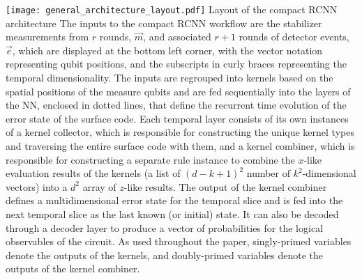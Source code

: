 \begin{figure*}[htb]
\centering
\texttt{[image: general\_architecture\_layout.pdf]}
\ccaption
{Layout of the compact RCNN architecture}
{
The inputs to the compact RCNN workflow are the stabilizer measurements from $r$ rounds, $\vec{m}$, and associated $r+1$ rounds of detector events, $\vec{e}$, which are displayed at the bottom left corner, with the vector notation representing qubit positions, and the subscripts in curly braces representing the temporal dimensionality.
The inputs are regrouped into kernels based on the spatial positions of the measure qubits and are fed sequentially into the layers of the NN, enclosed in dotted lines, that define the recurrent time evolution of the error state of the surface code. Each temporal layer consists of its own instances of a kernel collector, which is responsible for constructing the unique kernel types and traversing the entire surface code with them, and a kernel combiner, which is responsible for constructing a separate rule instance to combine the $x$-like evaluation results of the kernels (a list of $(d-k+1)^2$ number of $k^2$-dimensional vectors) into a $d^2$ array of $z$-like results. The output of the kernel combiner defines a multidimensional error state for the temporal slice and is fed into the next temporal slice as the last known (or initial) state. It can also be decoded through a decoder layer to produce a vector of probabilities for the logical observables of the circuit. As used throughout the paper, singly-primed variables denote the outputs of the kernels, and doubly-primed variables denote the outputs of the kernel combiner.
}
\label{fig:RCNN-layout}
\end{figure*}

